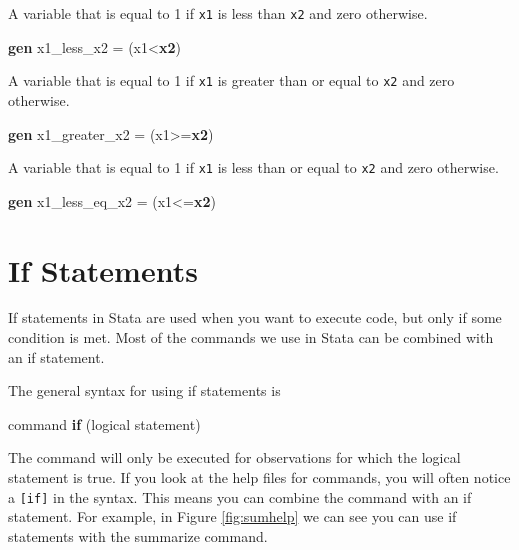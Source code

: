 \documentclass[
]{book}
\newenvironment{Shaded}{\begin{snugshade}}{\end{snugshade}}
\newcommand{\KeywordTok}[1]{\textcolor[rgb]{0.13,0.29,0.53}{\textbf{#1}}}
\newcommand{\NormalTok}[1]{#1}
\begin{document}
A variable that is equal to 1 if \texttt{x1} is less than \texttt{x2} and zero otherwise.

\begin{Shaded}
\begin{Highlighting}[]
\KeywordTok{gen}\NormalTok{ x1\_less\_x2 = (x1\textless{}}\KeywordTok{x2}\NormalTok{)}
\end{Highlighting}
\end{Shaded}

A variable that is equal to 1 if \texttt{x1} is greater than or equal to \texttt{x2} and zero otherwise.

\begin{Shaded}
\begin{Highlighting}[]
\KeywordTok{gen}\NormalTok{ x1\_greater\_x2 = (x1\textgreater{}=}\KeywordTok{x2}\NormalTok{)}
\end{Highlighting}
\end{Shaded}

A variable that is equal to 1 if \texttt{x1} is less than or equal to \texttt{x2} and zero otherwise.

\begin{Shaded}
\begin{Highlighting}[]
\KeywordTok{gen}\NormalTok{ x1\_less\_eq\_x2 = (x1\textless{}=}\KeywordTok{x2}\NormalTok{)}
\end{Highlighting}
\end{Shaded}

\section{If Statements}\label{if-statements}

If statements in Stata are used when you want to execute code, but only if some condition is met. Most of the commands we use in Stata can be combined with an if statement.

The general syntax for using if statements is

\begin{Shaded}
\begin{Highlighting}[]
\NormalTok{command }\KeywordTok{if}\NormalTok{ (logical statement)}
\end{Highlighting}
\end{Shaded}

The command will only be executed for observations for which the logical statement is true. If you look at the help files for commands, you will often notice a \texttt{{[}if{]}} in the syntax. This means you can combine the command with an if statement. For example, in Figure \ref{fig:sumhelp} we can see you can use if statements with the summarize command.
\end{document}

